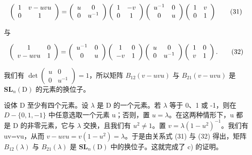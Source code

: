 \[
\left( \begin{array}{c c} 1 & v - u v u \\ 0 & 1 \end{array} \right) = \left( \begin{array}{c c} u & 0 \\ 0 & u ^ {- 1} \end{array} \right) \left( \begin{array}{c c} 1 & - v \\ 0 & 1 \end{array} \right) \left( \begin{array}{c c} u ^ {- 1} & 0 \\ 0 & u \end{array} \right) \left( \begin{array}{c c} 1 & v \\ 0 & 1 \end{array} \right)\tag{31}
\]

与

\[
\left( \begin{array}{c c} 1 & 0 \\ v - u v u & 1 \end{array} \right) = \left( \begin{array}{c c} u ^ {- 1} & 0 \\ 0 & u \end{array} \right) \left( \begin{array}{c c} 1 & 0 \\ - v & 1 \end{array} \right) \left( \begin{array}{c c} u & 0 \\ 0 & u ^ {- 1} \end{array} \right) \left( \begin{array}{c c} 1 & 0 \\ v & 1 \end{array} \right).\tag{32}
\]

我们有 \(\det\left(\begin{matrix}u & 0 \\ 0 & u^{-1}\end{matrix}\right)=1\)，所以矩阵 \(B_{12}(v-uvu)\) 与 \(B_{21}(v-uvu)\) 是 \(\mathbf{SL}_{n}(\mathrm{D})\) 的元素的换位子。

设体 D 至少有四个元素。设 \(\lambda\) 是 D 的一个元素。若 \(\lambda\) 等于 0、1 或 -1，则在 \(D-\{0,1,-1\}\) 中任意选取一个元素 u；否则，置 \(u=\lambda\)。在这两种情形下，u 都是 D 的非零元素，它与 \(\lambda\) 交换，且我们有 \(u^{2}\neq1\)。置 \(v=\lambda(1-u^{2})^{-1}\)。我们有 uv=vu，从而 \(v-uvu=v(1-u^{2})=\lambda\)。于是由关系式 (31) 与 (32) 得出，矩阵 \(B_{12}(\lambda)\) 与 \(B_{21}(\lambda)\) 是 \(\mathbf{SL}_{n}(\mathrm{D})\) 中的换位子。这就完成了 c) 的证明。

